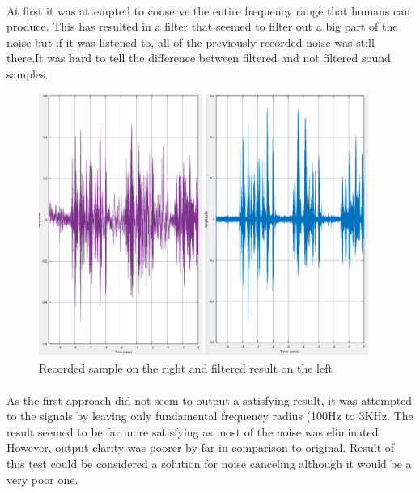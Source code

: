 \paragraph{} At first it was attempted to conserve the entire frequency range that humans can produce. This has resulted in a filter that seemed to filter out a big part of the noise but if it was listened to, all of the previously recorded noise was still there.It was hard to tell the difference between filtered and not filtered sound samples.

\begin{figure}[htp]
  \centering
    \includegraphics[width=0.7\paperwidth]{Illustrations/100HZto17KHzfilter}
    \caption{Recorded sample on the right and filtered result on the left}
\end{figure}

\paragraph{} As the first approach did not seem to output a satisfying result, it was attempted to the signals by leaving only fundamental frequency radius (100Hz to 3KHz. The result seemed to be far more satisfying as most of the noise was eliminated. However, output clarity was poorer by far in comparison to original. Result of this test could be considered a solution for noise canceling although it would be a very poor one.

